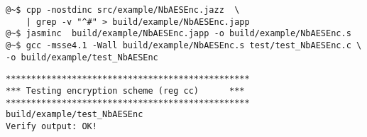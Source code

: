 \newpage
{}
\begin{lstlisting}[style=normal]
@~$ cpp -nostdinc src/example/NbAESEnc.jazz  \
	| grep -v "^#" > build/example/NbAESEnc.japp
@~$ jasminc  build/example/NbAESEnc.japp -o build/example/NbAESEnc.s
@~$ gcc -msse4.1 -Wall build/example/NbAESEnc.s test/test_NbAESEnc.c \
-o build/example/test_NbAESEnc
\end{lstlisting}
\begin{lstlisting}[style=normal]
************************************************
*** Testing encryption scheme (reg cc)      *** 
************************************************
build/example/test_NbAESEnc
Verify output: OK!
\end{lstlisting}


